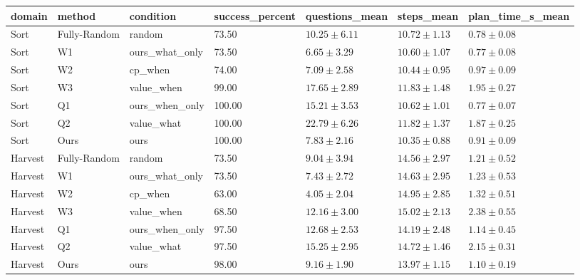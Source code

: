 \begin{tabular}{lllllll}
\hline
domain & method & condition & success\_percent & questions\_mean & steps\_mean & plan\_time\_s\_mean \\
\hline
Sort & Fully-Random & random & 73.50 & $10.25 \pm 6.11$ & $10.72 \pm 1.13$ & $0.78 \pm 0.08$ \\
Sort & W1 & ours\_what\_only & 73.50 & $6.65 \pm 3.29$ & $10.60 \pm 1.07$ & $0.77 \pm 0.08$ \\
Sort & W2 & cp\_when & 74.00 & $7.09 \pm 2.58$ & $10.44 \pm 0.95$ & $0.97 \pm 0.09$ \\
Sort & W3 & value\_when & 99.00 & $17.65 \pm 2.89$ & $11.83 \pm 1.48$ & $1.95 \pm 0.27$ \\
Sort & Q1 & ours\_when\_only & 100.00 & $15.21 \pm 3.53$ & $10.62 \pm 1.01$ & $0.77 \pm 0.07$ \\
Sort & Q2 & value\_what & 100.00 & $22.79 \pm 6.26$ & $11.82 \pm 1.37$ & $1.87 \pm 0.25$ \\
Sort & Ours & ours & 100.00 & $7.83 \pm 2.16$ & $10.35 \pm 0.88$ & $0.91 \pm 0.09$ \\
Harvest & Fully-Random & random & 73.50 & $9.04 \pm 3.94$ & $14.56 \pm 2.97$ & $1.21 \pm 0.52$ \\
Harvest & W1 & ours\_what\_only & 73.50 & $7.43 \pm 2.72$ & $14.63 \pm 2.95$ & $1.23 \pm 0.53$ \\
Harvest & W2 & cp\_when & 63.00 & $4.05 \pm 2.04$ & $14.95 \pm 2.85$ & $1.32 \pm 0.51$ \\
Harvest & W3 & value\_when & 68.50 & $12.16 \pm 3.00$ & $15.02 \pm 2.13$ & $2.38 \pm 0.55$ \\
Harvest & Q1 & ours\_when\_only & 97.50 & $12.68 \pm 2.53$ & $14.19 \pm 2.48$ & $1.14 \pm 0.45$ \\
Harvest & Q2 & value\_what & 97.50 & $15.25 \pm 2.95$ & $14.72 \pm 1.46$ & $2.15 \pm 0.31$ \\
Harvest & Ours & ours & 98.00 & $9.16 \pm 1.90$ & $13.97 \pm 1.15$ & $1.10 \pm 0.19$ \\
\hline
\end{tabular}
